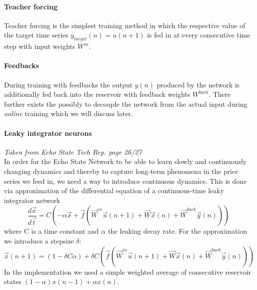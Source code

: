 \paragraph*{Teacher forcing}
Teacher forcing is the simplest training method in which the respective value of the target time series $y_{target}(n)=u(n+1)$ is fed in at every consecutive time step with input weights $W^{in}$. 

\paragraph*{Feedbacks}
During training with feedbacks the output $y(n)$ produced by the network is additionally fed back into the reservoir with feedback weights $W^{back}$. There further exists the possibly to decouple the network from the actual input during \emph{online} training which we will discuss later.

\paragraph*{Leaky integrator neurons}
\emph{Taken from Echo State Tech Rep. page 26/27}\\
In order for the Echo State Network to be able to learn slowly and continuously changing dynamics and thereby to capture long-term phenomena in the price series we feed in, we need a way to introduce continuous dynamics. This is done via approximation of the differential equation of a continuous-time leaky integrator network
\begin{equation}\label{eq:leaky}
    \frac{d\vec{x}}{d\vec{t}} = C (-\alpha\vec{x} + \vec{f}(\vec{W}^{in}\vec{u}(n+1)+\vec{W}\vec{x}(n)+\vec{W}^{back}\vec{y}(n)))
\end{equation}
where C is a time constant and $\alpha$ the leaking decay rate. For the approximation we introduce a stepsize $\delta$:
\begin{equation}
    \vec{x}(n+1)=(1-\delta C \alpha) + \delta C (\vec{f}(\vec{W}^{in}\vec{u}(n+1)+\vec{W}\vec{x}(n)+\vec{W}^{back}\vec{y}(n)))
\end{equation}
In the implementation we used a simple weighted average of consecutive reservoir states $(1-\alpha)x(n-1)+\alpha x(n)$.

